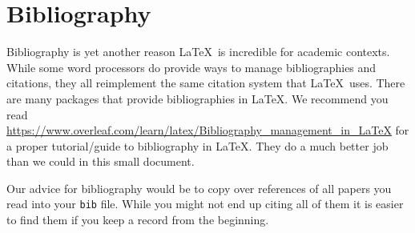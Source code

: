 \section{Bibliography}
Bibliography is yet another reason \LaTeX\ is incredible for academic contexts. While some word processors do provide ways to manage bibliographies and citations, they all reimplement the same citation system that \LaTeX\ uses. There are many packages that provide bibliographies in \LaTeX. We recommend you read \url{https://www.overleaf.com/learn/latex/Bibliography_management_in_LaTeX} for a proper tutorial/guide to bibliography in \LaTeX. They do a much better job than we could in this small document.

Our advice for bibliography would be to copy over references of all papers you read into your \texttt{bib} file. While you might not end up citing all of them it is easier to find them if you keep a record from the beginning.

\newpage
